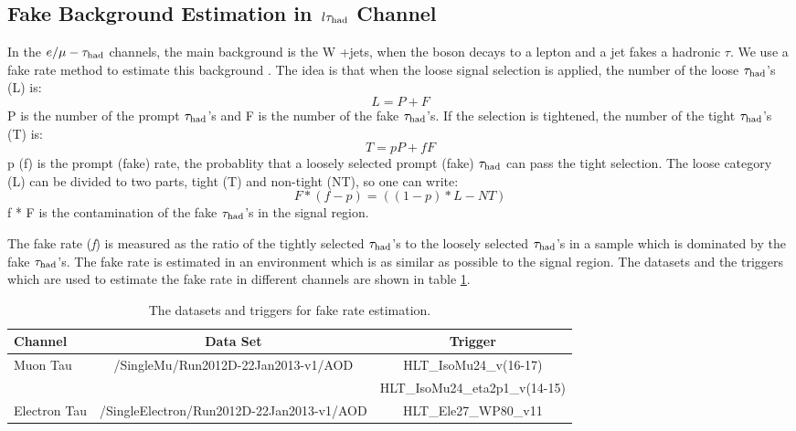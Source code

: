 \subsection{\texorpdfstring{Fake Background Estimation in $\,l\tau_{\rm had}$ Channel}{Fake Background Estimation in lepton-tau Channel}}
\label{sect:bkgLeptau}
In the $e/\mu-\tau_{\rm had}$ channels, the main background is the W +jets, when the \Wz boson decays to a lepton and a jet fakes a hadronic $\tau$.
We use a fake rate method to estimate this background \cite{CMS_AN_2010-261}. 
The idea is that when the loose signal selection is applied, the number of the loose $\tau_{\rm had}$'s (L) is:
\begin{equation}
L = P + F
\end{equation}
P is the number of the  prompt $\tau_{\rm had}$'s and F is the number of the  fake $\tau_{\rm had}$'s. If the selection is tightened, the number of the tight $\tau_{\rm had}$'s (T) is:
\begin{equation}
 T = pP + fF
\end{equation} 
p (f) is the prompt (fake) rate, the probablity that a loosely selected prompt (fake) $\tau_{\rm had}$ can pass the  tight  selection. The loose category (L) can be divided to two parts, 
tight (T) and non-tight (NT), so one can write:
\begin{equation}
   F * (f - p) = ((1 - p) * L - NT)
\end{equation}
f * F is the contamination of the fake $\tau_{\rm had}$'s in the signal region. 

The fake rate ({\it f}) is measured as the ratio of the tightly selected $\tau_{\rm had}$'s to the loosely 
selected $\tau_{\rm had}$'s in a sample which is dominated by the fake $\tau_{\rm had}$'s. The fake rate is estimated in an environment which is as similar as possible to 
the signal region. The datasets and the triggers which are used to estimate the fake rate in different channels are shown in 
table \ref{Tab.DataFR}.
\begin{table}[!htb]
\begin{center}
\caption{The datasets and triggers for fake rate estimation.}
\label{Tab.DataFR}
\begin{tabular}{|l|c|c|}
\hline
Channel      & Data Set                                     & Trigger \\\hline
Muon Tau     & /SingleMu/Run2012D-22Jan2013-v1/AOD          & HLT\_IsoMu24\_v(16-17)\\
             &                                              & HLT\_IsoMu24\_eta2p1\_v(14-15)\\\hline
Electron Tau & /SingleElectron/Run2012D-22Jan2013-v1/AOD    & HLT\_Ele27\_WP80\_v11\\
\hline
\end{tabular}
\end{center}
\end{table}


